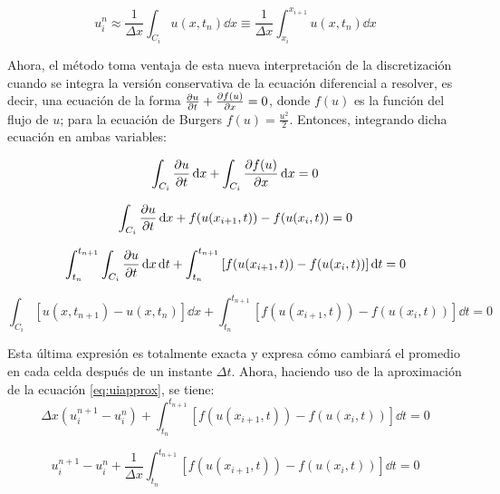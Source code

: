 \documentclass[12pt]{article}
\begin{document}
	\begin{equation}
		u_{i}^{n} \approx \frac{1}{\Delta x} \int_{C_i} u(x,t_n) \dd{x} \equiv \frac{1}{\Delta x} \int_{x_i}^{x_{i+1}} u(x,t_n) \dd{x}
		\label{eq:uiapprox}
	\end{equation}
	
	Ahora, el método toma ventaja de esta nueva interpretación de la discretización cuando se integra la versión conservativa de la ecuación diferencial a resolver, es decir, una ecuación de la forma $\pdv{u}{t} + \pdv{f(u)}{x} = 0$, donde $f(u)$ es la función del flujo de $u$; para la ecuación de Burgers $f(u) = \frac{u^2}{2}$. Entonces, integrando dicha ecuación en ambas variables:
	
	\begin{equation}
		\int_{C_i} \pdv{u}{t} \dd{x} + \int_{C_i} \pdv{f(u)}{x} \dd{x} = 0
		\label{eq:ecuacion-integrada}
	\end{equation}

	\begin{equation}
		\int_{C_i} \pdv{u}{t} \dd{x} + f(u(x_{i+1} ,t)) - f(u(x_{i},t)) = 0
	\end{equation}

	\begin{equation}
		\int_{t_n}^{t_{n+1}} \int_{C_i} \pdv{u}{t} \dd{x} \dd{t} + \int_{t_n}^{t_{n+1}}\left[ f(u(x_{i+1} ,t)) - f(u(x_{i},t))\right]\dd{t} = 0
	\end{equation}

	\begin{equation}
		\int_{C_i} \left[u(x, t_{n+1}) - u(x, t_n)\right] \dd{x} + \int_{t_n}^{t_{n+1}}\left[ f(u(x_{i+1} ,t)) - f(u(x_{i},t))\right]\dd{t} = 0 
	\end{equation}
	
	Esta última expresión es totalmente exacta y expresa cómo cambiará el promedio en cada celda después de un instante $\Delta t$. Ahora, haciendo uso de la aproximación de la ecuación \ref{eq:uiapprox}, se tiene:
	\begin{equation}
		 \Delta x\left( u_{i}^{n+1} - u_{i}^{n}\right)   + \int_{t_n}^{t_{n+1}}\left[ f(u(x_{i+1} ,t)) - f(u(x_{i},t))\right]\dd{t} = 0 
	\end{equation}

	\begin{equation}
		u_{i}^{n+1} - u_{i}^{n} + \frac{1}{\Delta x}\int_{t_n}^{t_{n+1}}\left[ f(u(x_{i+1} ,t)) - f(u(x_{i},t))\right]\dd{t} = 0 
	\end{equation}
\end{document}

